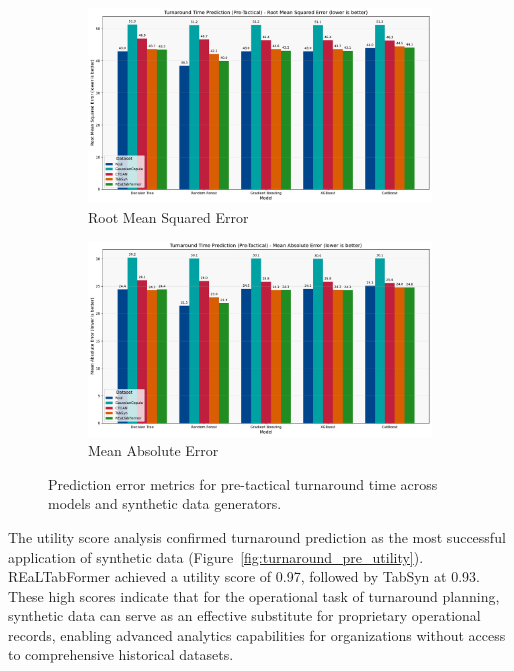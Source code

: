 \documentclass[conference]{IEEEtran}
\begin{document}
\begin{figure}[htbp]
    \centering
    \begin{subfigure}[b]{0.49\textwidth}
        \includegraphics[width=\linewidth]{plots/turnaround_min_pre-tactical/turnaround_min_pre-tactical_rmse.pdf}
        \caption{Root Mean Squared Error}
        \label{fig:turnaround_pre_rmse}
    \end{subfigure}
    \hfill
    \begin{subfigure}[b]{0.49\textwidth}
        \includegraphics[width=\linewidth]{plots/turnaround_min_pre-tactical/turnaround_min_pre-tactical_mae.pdf}
        \caption{Mean Absolute Error}
        \label{fig:turnaround_pre_mae}
    \end{subfigure}
    \caption{Prediction error metrics for pre-tactical turnaround time across models and synthetic data generators.}
\end{figure}

The utility score analysis confirmed turnaround prediction as the most successful application of synthetic data (Figure~\ref{fig:turnaround_pre_utility}). REaLTabFormer achieved a utility score of 0.97, followed by TabSyn at 0.93. These high scores indicate that for the operational task of turnaround planning, synthetic data can serve as an effective substitute for proprietary operational records, enabling advanced analytics capabilities for organizations without access to comprehensive historical datasets.
\end{document}
